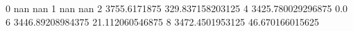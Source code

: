 0 nan nan
1 nan nan
2 3755.6171875 329.837158203125
4 3425.780029296875 0.0
6 3446.89208984375 21.112060546875
8 3472.4501953125 46.670166015625
